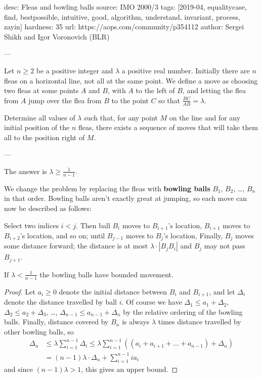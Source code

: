 desc: Fleas and bowling balls
source: IMO 2000/3
tags: [2019-04, equalitycase, find, bestpossible, intuitive, good, algorithm, understand, invariant, process, zayin]
hardness: 35
url: https://aops.com/community/p354112
author: Sergei Shikh and Igor Voronovich (BLR)

---

Let $n \ge 2$ be a positive integer
and $\lambda$ a positive real number.
Initially there are $n$ fleas on a horizontal line,
not all at the same point.
We define a move as choosing two fleas at some points $A$ and $B$,
with $A$ to the left of $B$,
and letting the flea from $A$ jump over the flea from $B$ to the point $C$
so that $\frac{BC}{AB} = \lambda$.

Determine all values of $ \lambda$ such that,
for any point $M$ on the line
and for any initial position of the $n$ fleas,
there exists a sequence of moves that will take
them all to the position right of $M$.

---

The answer is $\lambda \ge \frac{1}{n-1}$.

We change the problem by replacing the fleas
with \textbf{bowling balls} $B_1$, $B_2$, \dots, $B_n$ in that order.
Bowling balls aren't exactly great at jumping,
so each move can now be described as follows:
\begin{itemize}
\ii Select two indices $i < j$.
Then ball $B_i$ moves to $B_{i+1}$'s location,
$B_{i+1}$ moves to $B_{i+2}$'s location, and so on;
until $B_{j-1}$ moves to $B_j$'s location,
\ii Finally, $B_j$ moves some distance forward;
the distance is at most $\lambda \cdot |B_j B_i|$
and $B_j$ may not pass $B_{j+1}$.
\end{itemize}

\begin{claim*}
  If $\lambda < \frac{1}{n-1}$
  the bowling balls have bounded movement.
\end{claim*}
\begin{proof}
  Let $a_i \ge 0$ denote the initial distance
  between $B_i$ and $B_{i+1}$,
  and let $\Delta_i$ denote the distance travelled by ball $i$.
  Of course we have
  $\Delta_1 \le a_1 + \Delta_2$,
  $\Delta_2 \le a_2 + \Delta_3$,
  \dots,
  $\Delta_{n-1} \le a_{n-1} + \Delta_n$
  by the relative ordering of the bowling balls.
  Finally, distance covered by $B_n$ is always
  $\lambda$ times distance travelled by other bowling balls, so
  \begin{align*}
    \Delta_n &\le \lambda \sum_{i=1}^{n-1} \Delta_i
    \le \lambda \sum_{i=1}^{n-1}
    \left( \left( a_i + a_{i+1} + \dots + a_{n-1} \right)
      + \Delta_n \right) \\
    &= (n-1)\lambda \cdot \Delta_n + \sum_{i=1}^{n-1} i a_i
  \end{align*}
  and since $(n-1)\lambda > 1$, this gives an upper bound.
\end{proof}


